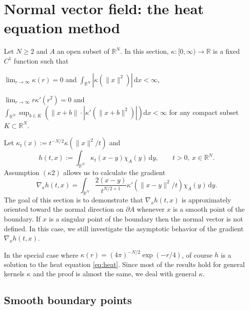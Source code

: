 \documentclass[graybox]{svmult}
\renewcommand{\d}{\mathrm{d}}  %
\newcommand{\R}{\mathbb{R}}  %
\renewcommand{\AA}{A}  %
\begin{document}
\section{Normal vector field: the heat equation method}\label{sec3}
Let $N\ge2$ and $\AA$ an open subset of $\R^N$. In this section, $\kappa\colon [0,\infty) \to \R$ is  a fixed $C^1$ function such that 
\begin{description}[($\kappa1$)]
\item[($\kappa1$)]{$\displaystyle\lim_{r\to \infty} \kappa(r)=0$ and $\displaystyle \int_{\R^N} |\kappa(\|x\|^2)|\,\d x <\infty$,}  
\item[($\kappa2$)]{$\displaystyle\lim_{r\to \infty} r \kappa'(r^2)=0$ and  $\displaystyle\int_{\R^N}  \sup_{b \in K}\left( \|x + b\| \!\cdot\!|\kappa'(\|x+b \|^2)|\right)\d x<\infty$ for any compact subset $K \subset \R^N$.} 
\end{description}
Let $\kappa_t(x) := t^{-N/2} \kappa(\|x\|^2/t)$ and 
\[
h(t,x) := \int_{\R^N} \kappa_t(x-y) \chi_\AA(y)\, \d y, \qquad t>0,~ x\in \R^N.  
\]
Assumption $(\kappa2)$ allows us to calculate the gradient
\begin{equation}\label{eq:nablah}
\nabla_x h(t, x) = \int_{\R^N} \frac{2(x-y)}{t^{N/2+1}} \kappa'(\|x-y\|^2/t)\chi_\AA(y) \,\d y. 
\end{equation}
The goal of this section is to demonstrate that $\nabla_x h(t, x)$ is approximately oriented toward the normal direction on  $\partial \AA$ whenever $x$ is a smooth point of the boundary. If $x$ is a singular point of the boundary then the normal vector is not defined. In this case, we still investigate the asymptotic behavior of the gradient $\nabla_x h(t, x)$.  

In the special case where $\kappa(r) = (4\pi)^{-N/2} \exp(-r/4)$, of course $h$ is a solution to the heat equation \eqref{eq:heat}. Since most of the results hold for general kernels $\kappa$ and the proof is almost the same, we deal with general $\kappa$. 





\subsection{Smooth boundary points}\label{sec3.1}
\end{document}
